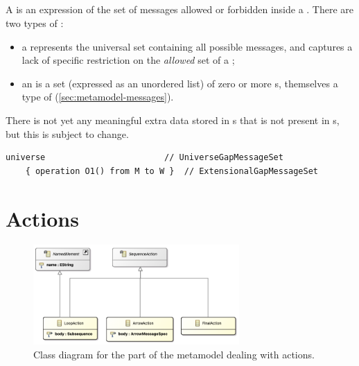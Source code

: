 \subsection{\mgapmessageset}\label{ssec:metamodel-sequences-gap-message-sets}

A \mgapmessageset{} is an expression of the set of messages allowed or forbidden
inside a \msequencegap.  There are two types of \mgapmessageset:

\begin{itemize}
\item
	a \muniversegapmessageset{} represents the universal set containing 
	all possible messages, and
	captures a lack of specific restriction on
	the \emph{allowed} set of a \msequencegap;
\item	
	an \mextensionalgapmessageset{} is a set (expressed as an unordered list) of
	zero or more \mgapmessagespec s, themselves
	a type of \mmessagespec{} (\cref{sec:metamodel-messages}).
\end{itemize}

There is not yet any meaningful extra data stored in
\mgapmessagespec s that is not present in \mmessagespec s, but this is subject
to change.

\begin{lstlisting}[style=Example]
    universe                        // UniverseGapMessageSet
    { operation O1() from M to W }  // ExtensionalGapMessageSet
\end{lstlisting}


\section{Actions}\label{sec:metamodel-actions}

\begin{figure}
	\centering
	\includegraphics[width=0.7\textwidth]{diagrams/actions.png}
	\caption{Class diagram for the part of the \langname{} metamodel dealing with actions.}
	\label{fig:metamodel-actions}
\end{figure}

